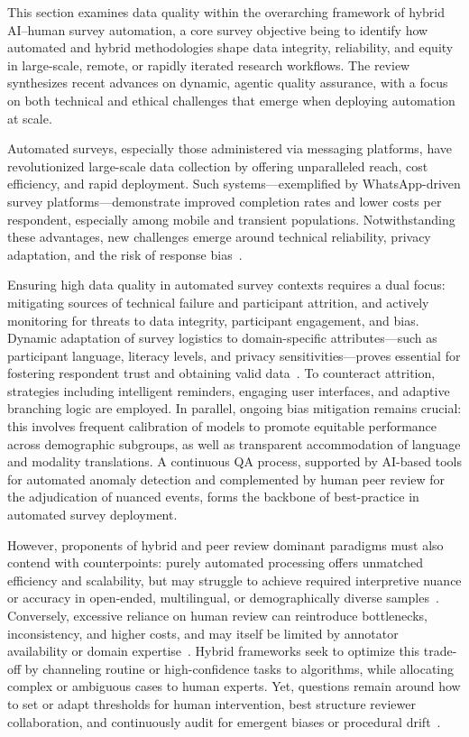 \documentclass[sigconf]{acmart}
\begin{document}
This section examines data quality within the overarching framework of hybrid AI–human survey automation, a core survey objective being to identify how automated and hybrid methodologies shape data integrity, reliability, and equity in large-scale, remote, or rapidly iterated research workflows. The review synthesizes recent advances on dynamic, agentic quality assurance, with a focus on both technical and ethical challenges that emerge when deploying automation at scale.

Automated surveys, especially those administered via messaging platforms, have revolutionized large-scale data collection by offering unparalleled reach, cost efficiency, and rapid deployment. Such systems—exemplified by WhatsApp-driven survey platforms—demonstrate improved completion rates and lower costs per respondent, especially among mobile and transient populations. Notwithstanding these advantages, new challenges emerge around technical reliability, privacy adaptation, and the risk of response bias~\cite{ref117}.

Ensuring high data quality in automated survey contexts requires a dual focus: mitigating sources of technical failure and participant attrition, and actively monitoring for threats to data integrity, participant engagement, and bias. Dynamic adaptation of survey logistics to domain-specific attributes—such as participant language, literacy levels, and privacy sensitivities—proves essential for fostering respondent trust and obtaining valid data~\cite{ref117}. To counteract attrition, strategies including intelligent reminders, engaging user interfaces, and adaptive branching logic are employed. In parallel, ongoing bias mitigation remains crucial: this involves frequent calibration of models to promote equitable performance across demographic subgroups, as well as transparent accommodation of language and modality translations. A continuous QA process, supported by AI-based tools for automated anomaly detection and complemented by human peer review for the adjudication of nuanced events, forms the backbone of best-practice in automated survey deployment.

However, proponents of hybrid and peer review dominant paradigms must also contend with counterpoints: purely automated processing offers unmatched efficiency and scalability, but may struggle to achieve required interpretive nuance or accuracy in open-ended, multilingual, or demographically diverse samples~\cite{ref88,ref89,ref91,ref92,ref93}. Conversely, excessive reliance on human review can reintroduce bottlenecks, inconsistency, and higher costs, and may itself be limited by annotator availability or domain expertise~\cite{ref89,ref91}. Hybrid frameworks seek to optimize this trade-off by channeling routine or high-confidence tasks to algorithms, while allocating complex or ambiguous cases to human experts. Yet, questions remain around how to set or adapt thresholds for human intervention, best structure reviewer collaboration, and continuously audit for emergent biases or procedural drift~\cite{ref91,ref93}.
\end{document}
